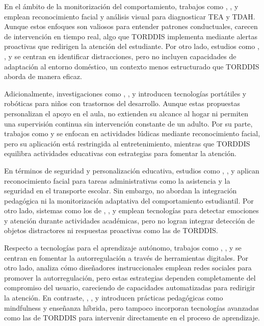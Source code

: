 \documentclass[a4paper,fleqn]{cas-sc}
\begin{document}
					En el ámbito de la monitorización del comportamiento, trabajos como \cite{Akter2021}, \cite{Pelc2006}, y \cite{Albrecht2014} emplean reconocimiento facial y análisis visual para diagnosticar TEA y TDAH. Aunque estos enfoques son valiosos para entender patrones conductuales, carecen de intervención en tiempo real, algo que TORDDIS implementa mediante alertas proactivas que redirigen la atención del estudiante. Por otro lado, estudios como \cite{Campbell2015Using}, \cite{Ucar2022Recognizing}, y \cite{Argel2023Intellitell} se centran en identificar distracciones, pero no incluyen capacidades de adaptación al entorno doméstico, un contexto menos estructurado que TORDDIS aborda de manera eficaz.
				
					Adicionalmente, investigaciones como \cite{Berrezueta-Guzman2021}, \cite{VilliersRader2021}, y \cite{Washington2016AWereable} introducen tecnologías portátiles y robóticas para niños con trastornos del desarrollo. Aunque estas propuestas personalizan el apoyo en el aula, no extienden su alcance al hogar ni permiten una supervisión continua sin intervención constante de un adulto. Por su parte, trabajos como \cite{Muller2018ArchnSmile} y \cite{Nguyen2019} se enfocan en actividades lúdicas mediante reconocimiento facial, pero su aplicación está restringida al entretenimiento, mientras que TORDDIS equilibra actividades educativas con estrategias para fomentar la atención.
				
					En términos de seguridad y personalización educativa, estudios como \cite{Hachad2020}, \cite{James2019}, y \cite{Boumiza2017} aplican reconocimiento facial para tareas administrativas como la asistencia y la seguridad en el transporte escolar. Sin embargo, no abordan la integración pedagógica ni la monitorización adaptativa del comportamiento estudiantil. Por otro lado, sistemas como los de \cite{DaCosta2023}, \cite{Kumar2024Zoom}, y \cite{Narkhede2023} emplean tecnologías para detectar emociones y atención durante actividades académicas, pero no logran integrar detección de objetos distractores ni respuestas proactivas como las de TORDDIS.
				
					Respecto a tecnologías para el aprendizaje autónomo, trabajos como \cite{Bembich2016Future}, \cite{Roberts2020Task}, y \cite{Peters2003Self} se centran en fomentar la autorregulación a través de herramientas digitales. Por otro lado, \cite{Muljana2022Instructional} analiza cómo diseñadores instruccionales emplean redes sociales para promover la autorregulación, pero estas estrategias dependen completamente del compromiso del usuario, careciendo de capacidades automatizadas para redirigir la atención. En contraste, \cite{Palmer2022impact}, \cite{Adcroft2018Developing}, y \cite{Salter2014Exploring} introducen prácticas pedagógicas como mindfulness y enseñanza híbrida, pero tampoco incorporan tecnologías avanzadas como las de TORDDIS para intervenir directamente en el proceso de aprendizaje.
				
\end{document}
